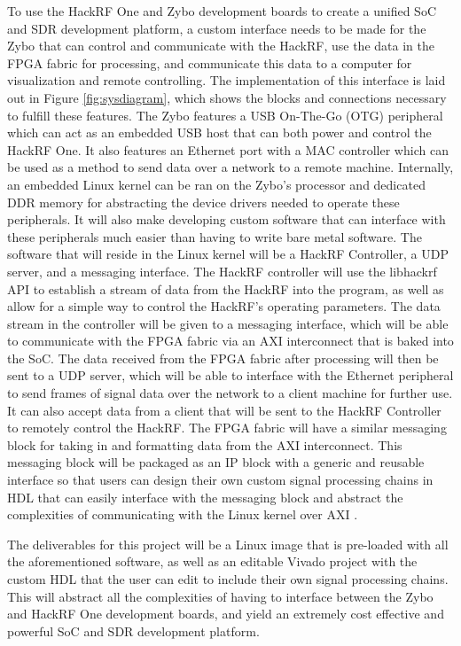 \documentclass[conference]{IEEEtran}
\begin{document}
To use the HackRF One and Zybo development boards to create a unified SoC and SDR development platform, a custom interface needs to be made for the Zybo that can control and communicate with the HackRF, use the data in the FPGA fabric for processing, and communicate this data to a computer for visualization and remote controlling. The implementation of this interface is laid out in Figure \ref{fig:sysdiagram}, which shows the blocks and connections necessary to fulfill these features. The Zybo features a USB On-The-Go (OTG) peripheral which can act as an embedded USB host that can both power and control the HackRF One. It also features an Ethernet port with a MAC controller which can be used as a method to send data over a network to a remote machine. Internally, an embedded Linux kernel can be ran on the Zybo's processor and dedicated DDR memory for abstracting the device drivers needed to operate these peripherals. It will also make developing custom software that can interface with these peripherals much easier than having to write bare metal software. The software that will reside in the Linux kernel will be a HackRF Controller, a UDP server, and a messaging interface. The HackRF controller will use the libhackrf API to establish a stream of data from the HackRF into the program, as well as allow for a simple way to control the HackRF's operating parameters. The data stream in the controller will be given to a messaging interface, which will be able to communicate with the FPGA fabric via an AXI interconnect that is baked into the SoC. The data received from the FPGA fabric after processing will then be sent to a UDP server, which will be able to interface with the Ethernet peripheral to send frames of signal data over the network to a client machine for further use. It can also accept data from a client that will be sent to the HackRF Controller to remotely control the HackRF. The FPGA fabric will have a similar messaging block for taking in and formatting data from the AXI interconnect. This messaging block will be packaged as an IP block with a generic and reusable interface so that users can design their own custom signal processing chains in HDL that can easily interface with the messaging block and abstract the complexities of communicating with the Linux kernel over AXI \cite{digilent_zybo_manual,hackrf_repo}. 

The deliverables for this project will be a Linux image that is pre-loaded with all the aforementioned software, as well as an editable Vivado project with the custom HDL that the user can edit to include their own signal processing chains. This will abstract all the complexities of having to interface between the Zybo and HackRF One development boards, and yield an extremely cost effective and powerful SoC and SDR development platform.
\end{document}
